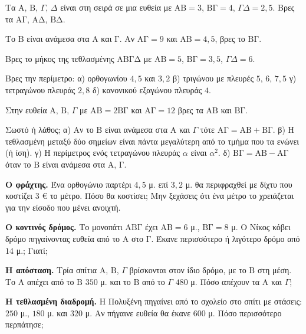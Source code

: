 

\ex Τα $\mathrm{Α},\,\mathrm{Β},\,\Gamma,\,\Delta$ είναι στη σειρά σε μια ευθεία με $\mathrm{ΑΒ}=3$, $\mathrm{ΒΓ}=4$, $\Gamma\Delta=2{,}5$. Βρες τα $\mathrm{ΑΓ}$, $\mathrm{ΑΔ}$, $\mathrm{ΒΔ}$.

\ex Το $\mathrm{Β}$ είναι ανάμεσα στα $\mathrm{Α}$ και $\mathrm{Γ}$. Αν $\mathrm{ΑΓ}=9$ και $\mathrm{ΑΒ}=4{,}5$, βρες το $\mathrm{ΒΓ}$.

\ex Βρες το μήκος της τεθλασμένης $\mathrm{ΑΒΓΔ}$ με $\mathrm{ΑΒ}=5$, $\mathrm{ΒΓ}=3{,}5$, $\Gamma\Delta=6$.

\ex Βρες την περίμετρο: α) ορθογωνίου $4{,}5$ και $3{,}2$ \quad β) τριγώνου με πλευρές $5$, $6$, $7{,}5$ \quad γ) τετραγώνου πλευράς $2{,}8$ \quad δ) κανονικού εξαγώνου πλευράς $4$.

\ex Στην ευθεία $\mathrm{Α},\,\mathrm{Β},\,\Gamma$ με $\mathrm{ΑΒ}=2\mathrm{ΒΓ}$ και $\mathrm{ΑΓ}=12$ βρες τα $\mathrm{ΑΒ}$ και $\mathrm{ΒΓ}$.

\ex Σωστό ή λάθος; α) Αν το $\mathrm{Β}$ είναι ανάμεσα στα $\mathrm{Α}$ και $\Gamma$ τότε $\mathrm{ΑΓ}=\mathrm{ΑΒ}+\mathrm{ΒΓ}$. \quad β) Η τεθλασμένη μεταξύ δύο σημείων είναι πάντα μεγαλύτερη από το τμήμα που τα ενώνει (ή ίση). \quad γ) Η περίμετρος ενός τετραγώνου πλευράς $\alpha$ είναι $\alpha^2$. \quad δ) $\mathrm{ΒΓ}=\mathrm{ΑΒ}-\mathrm{ΑΓ}$ όταν το $\mathrm{Β}$ είναι ανάμεσα στα $\mathrm{Α}$, $\mathrm{Γ}$.


\ex \textbf{Ο φράχτης.} Ένα ορθογώνιο παρτέρι $4{,}5$ μ. επί $3{,}2$ μ. θα περιφραχθεί με δίχτυ που κοστίζει $3$ € το μέτρο. Πόσο θα κοστίσει; Μην ξεχάσεις ότι ένα μέτρο το χρειάζεται για την είσοδο που μένει ανοιχτή.

\ex \textbf{Ο κοντινός δρόμος.} Το μονοπάτι $\mathrm{ΑΒΓ}$ έχει $\mathrm{ΑΒ}=6$ μ., $\mathrm{ΒΓ}=8$ μ. Ο Νίκος κόβει δρόμο πηγαίνοντας ευθεία από το $\mathrm{Α}$ στο $\mathrm{Γ}$. Έκανε περισσότερο ή λιγότερο δρόμο από $14$ μ.; Γιατί;

\ex \textbf{Η απόσταση.} Τρία σπίτια $\mathrm{Α}$, $\mathrm{Β}$, $\Gamma$ βρίσκονται στον ίδιο δρόμο, με το $\mathrm{Β}$ στη μέση. Το $\mathrm{Α}$ απέχει από το $\mathrm{Β}$ $350$ μ. και το $\mathrm{Β}$ από το $\Gamma$ $480$ μ. Πόσο απέχουν τα $\mathrm{Α}$ και $\Gamma$;

\ex \textbf{Η τεθλασμένη διαδρομή.} Η Πολυξένη πηγαίνει από το σχολείο στο σπίτι με στάσεις: $250$ μ., $180$ μ. και $320$ μ. Αν πήγαινε ευθεία θα έκανε $600$ μ. Πόσο περισσότερο περπάτησε;

